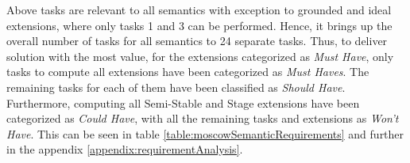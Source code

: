 Above tasks are relevant to all semantics with exception to grounded and ideal extensions, where only tasks 1 and 3 can be performed. Hence, it brings up the overall number of tasks for all semantics to 24 separate tasks. Thus, to deliver solution with the most value, for the extensions categorized as \textit{Must Have}, only tasks to compute all extensions have been categorized as \textit{Must Haves}. The remaining tasks for each of them have been classified as \textit{Should Have}. Furthermore, computing all Semi-Stable and Stage extensions have been categorized as \textit{Could Have}, with all the remaining tasks and extensions as \textit{Won't Have}. This can be seen in table \ref{table:moscowSemanticRequirements} and further in the appendix \ref{appendix:requirementAnalysis}. 


